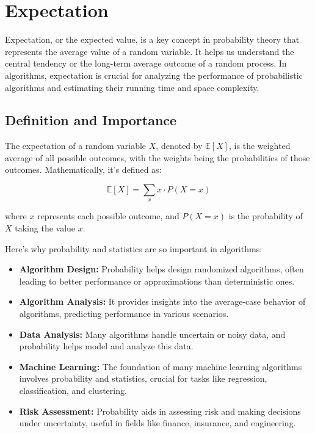 \documentclass[12pt]{book} %
\begin{document}
\section{Expectation}

Expectation, or the expected value, is a key concept in probability theory that represents the average value of a random variable. It helps us understand the central tendency or the long-term average outcome of a random process. In algorithms, expectation is crucial for analyzing the performance of probabilistic algorithms and estimating their running time and space complexity.

\subsection{Definition and Importance}

The expectation of a random variable \(X\), denoted by \(\mathbb{E}[X]\), is the weighted average of all possible outcomes, with the weights being the probabilities of those outcomes. Mathematically, it's defined as:

\[
\mathbb{E}[X] = \sum_{x} x \cdot P(X=x)
\]

where \(x\) represents each possible outcome, and \(P(X=x)\) is the probability of \(X\) taking the value \(x\).

Here's why probability and statistics are so important in algorithms:

\begin{itemize}
    \item \textbf{Algorithm Design:} Probability helps design randomized algorithms, often leading to better performance or approximations than deterministic ones.
    \item \textbf{Algorithm Analysis:} It provides insights into the average-case behavior of algorithms, predicting performance in various scenarios.
    \item \textbf{Data Analysis:} Many algorithms handle uncertain or noisy data, and probability helps model and analyze this data.
    \item \textbf{Machine Learning:} The foundation of many machine learning algorithms involves probability and statistics, crucial for tasks like regression, classification, and clustering.
    \item \textbf{Risk Assessment:} Probability aids in assessing risk and making decisions under uncertainty, useful in fields like finance, insurance, and engineering.
\end{itemize}
\end{document}
